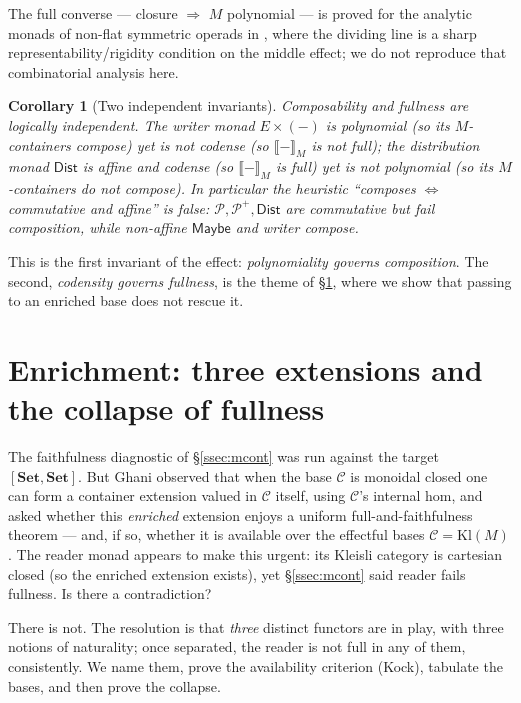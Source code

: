 \documentclass[11pt]{amsart}
\theoremstyle{plain}
\newtheorem{corollary}[theorem]{Corollary}
\theoremstyle{definition}
\theoremstyle{remark}
\newcommand{\Set}{\mathbf{Set}}
\newcommand{\Kl}{\mathrm{Kl}}
\newcommand{\extM}[1]{\llbracket #1 \rrbracket_{M}}
\newcommand{\Maybe}{\mathsf{Maybe}}
\newcommand{\Dist}{\mathsf{Dist}}
\newcommand{\PP}{\mathcal{P}}
\newcommand{\C}{\mathcal{C}}
\begin{document}
The full converse --- closure $\Rightarrow$ $M$ polynomial --- is proved for the analytic monads of
non-flat symmetric operads in \cite{MacBethCodensity}, where the dividing line is a sharp
representability/rigidity condition on the middle effect; we do not reproduce that combinatorial
analysis here.

\begin{corollary}[Two independent invariants]\label{cor:indep}
Composability and fullness are logically independent. The writer monad $E\times(-)$ is polynomial (so
its $M$-containers compose) yet is not codense (so $\extM{-}$ is not full); the distribution monad
$\Dist$ is affine and codense (so $\extM{-}$ is full) yet is not polynomial (so its $M$-containers do
not compose). In particular the heuristic ``composes $\iff$ commutative and affine'' is false:
$\PP,\PP^{+},\Dist$ are commutative but fail composition, while non-affine $\Maybe$ and writer compose.
\end{corollary}

This is the first invariant of the effect: \emph{polynomiality governs composition}. The second,
\emph{codensity governs fullness}, is the theme of \S\ref{sec:enrichment}, where we show that passing
to an enriched base does not rescue it.

\section{Enrichment: three extensions and the collapse of fullness}\label{sec:enrichment}

The faithfulness diagnostic of \S\ref{ssec:mcont} was run against the target $[\Set,\Set]$. But
Ghani observed that when the base $\C$ is monoidal closed one can form a container extension valued in
$\C$ itself, using $\C$'s internal hom, and asked whether this \emph{enriched} extension enjoys a
uniform full-and-faithfulness theorem --- and, if so, whether it is available over the effectful bases
$\C=\Kl(M)$. The reader monad appears to make this urgent: its Kleisli category is cartesian closed
(so the enriched extension exists), yet \S\ref{ssec:mcont} said reader fails fullness. Is there a
contradiction?

There is not. The resolution is that \emph{three} distinct functors are in play, with three notions of
naturality; once separated, the reader is not full in any of them, consistently. We name them, prove
the availability criterion (Kock), tabulate the bases, and then prove the collapse.
\end{document}
